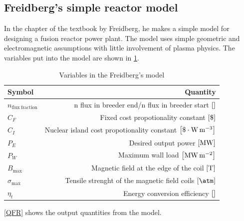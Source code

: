 \subsection{Freidberg's simple reactor model}
In the  chapter of the textbook by Freidberg\cite{freidberg_plasma_2007}, he makes a simple model for designing a fusion reactor power plant.
The model uses simple geometric and electromagnetic assumptions with little involvement of plasma physics. The variables put into the model are shown in \cref{VFR}.
\begin{table}
	\begin{tabular}{lr}
		\toprule
		Symbol                         & Quantity                                                                                 \\
		\midrule
		\(n_\mathrm{flux \ fraction}\) & n flux in breeder end/n flux in breeder start \(\bqty{}\)                                \\
		\(C_F\)                        & Fixed cost propotionality constant \(\bqty{\$}\)                                         \\
		\(C_I\)                        & Nuclear island cost propotionality constant \(\bqty{\$\cdot\si{\watt\per\meter\cubed}}\) \\
		\(P_E\)                        & Desired output power \(\bqty{\si{\mega\watt}}\)                                          \\
		\(P_W\)                        & Maximum wall load \(\bqty{\si{\mega\watt\per\meter\squared}}\)                           \\
		\(B_{\max}\)                   & Magnetic field at the edge of the coil \(\bqty{\si{\tesla}}\)                            \\
		\(\sigma_{\max}\)              & Tensile strenght of the magnetic field coils \(\bqty{\si{\atm}}\)                        \\
		\(\eta_t\)                     & Energy conversion efficiency \(\bqty{}\)                                                 \\
		\bottomrule
	\end{tabular}
	\caption{Variables in the Freidberg's model}
	\label{VFR}
\end{table}
\cref{QFR} shows the output quantities from the model.
